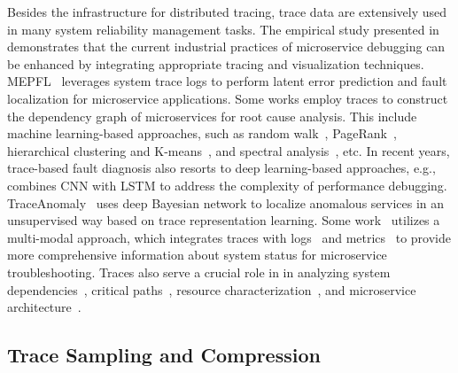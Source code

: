 Besides the infrastructure for distributed tracing, trace data are extensively used in many system reliability management tasks.
The empirical study presented in~\cite{DBLP:journals/tse/ZhouPXSJLD21} demonstrates that the current industrial practices of microservice debugging can be enhanced by integrating appropriate tracing and visualization techniques.
MEPFL~\cite{DBLP:conf/sigsoft/Zhou0X0JLXH19} leverages system trace logs to perform latent error prediction and fault localization for microservice applications.
Some works employ traces to construct the dependency graph of microservices for root cause analysis.
This include machine learning-based approaches, such as random walk~\cite{DBLP:conf/sigmetrics/KimSS13}, PageRank~\cite{DBLP:conf/www/YuCCGHJWSL21}, hierarchical clustering and K-means~\cite{DBLP:journals/smr/YuHC23}, and spectral analysis~\cite{DBLP:conf/issre/ZhouZPYLLZZD23}, etc.
In recent years, trace-based fault diagnosis also resorts to deep learning-based approaches, e.g., 
\cite{DBLP:conf/asplos/GanZHCHPD19} combines CNN with LSTM to address the complexity of performance debugging.
TraceAnomaly~\cite{DBLP:conf/issre/ZhouZPYLLZZD23} uses deep Bayesian network to localize anomalous services in an unsupervised way based on trace representation learning.
Some work~\cite{DBLP:conf/sigsoft/YuCLCLZ23,DBLP:conf/kbse/ChenLSZWLYL21,DBLP:conf/icse/LeeYCSL23} utilizes a multi-modal approach, which integrates traces with logs~\cite{DBLP:journals/csur/HeHCYSL21,DBLP:journals/corr/abs-2107-05908,DBLP:conf/ccs/Du0ZS17} and metrics~\cite{DBLP:journals/corr/abs-2308-00393,DBLP:conf/icse/ChenL00LL22} to provide more comprehensive information about system status for microservice troubleshooting.
Traces also serve a crucial role in in analyzing system dependencies~\cite{DBLP:conf/cloud/LuoXLYXZDH021,DBLP:conf/nsdi/WuCP19}, critical paths~\cite{DBLP:conf/usenix/0002RRPSC22}, resource characterization~\cite{DBLP:conf/icpp/WangLWJCWDXHYZ22,DBLP:conf/kbse/LiuJGHCFYYL23}, and microservice architecture~\cite{DBLP:conf/usenix/HuyeSS23,DBLP:conf/sigsoft/0001ZZIGC22}.

\subsection{Trace Sampling and Compression}

